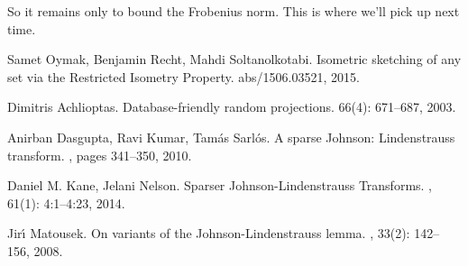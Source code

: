 \documentclass[11pt]{article}
\begin{document}
So it remains only to bound the Frobenius norm. This is where we'll pick up next time.



\begin{thebibliography}{42}
Samet Oymak, Benjamin Recht, Mahdi Soltanolkotabi.
\newblock Isometric sketching of any set via the Restricted Isometry Property. 
 abs/1506.03521, 2015.

Dimitris Achlioptas.
\newblock Database-friendly random projections.
 66(4): 671--687, 2003.

Anirban Dasgupta, Ravi Kumar, Tam{\'{a}}s Sarl{\'{o}}s.
\newblock A sparse Johnson: Lindenstrauss transform.
, pages 341--350, 2010.

Daniel M. Kane, Jelani Nelson.
\newblock Sparser Johnson-Lindenstrauss Transforms.
, 61(1): 4:1--4:23, 2014.

Jir{\'{\i}} Matousek.
\newblock On variants of the Johnson-Lindenstrauss lemma.
, 33(2): 142--156, 2008.

\end{thebibliography}
\end{document}
